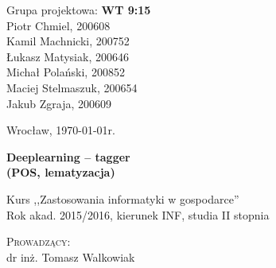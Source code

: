 \noindent
\begin{minipage}[t]{.5\linewidth}
	\begin{flushleft}
		Grupa projektowa: \textbf{WT 9:15}\\
		\vspace{0.8cm}
		Piotr Chmiel, 200608\\
		Kamil Machnicki, 200752\\
		Łukasz Matysiak, 200646\\
		Michał Polański, 200852\\
		Maciej Stelmaszuk, 200654\\
		Jakub Zgraja, 200609\\
	\end{flushleft} 
\end{minipage}%
\begin{minipage}[t]{.5\linewidth}
	\begin{flushright}
		Wrocław, \today r.\\
		\vspace{.35cm}

	\end{flushright}
\end{minipage}

\vspace{3.0cm}

\begin{center}
	{\Huge\bf Deeplearning -- tagger}\\
	{\Large\bf (POS, lematyzacja)}\\
		
\end{center}

\begin{center}
	{\large Kurs ,,Zastosowania informatyki w gospodarce''}\\
	{\large Rok akad. 2015/2016, kierunek INF, studia II stopnia}
\end{center}

\vspace{2cm}
\begin{center}
		\textsc{Prowadzący:}\\
		dr inż. Tomasz Walkowiak
\end{center}
